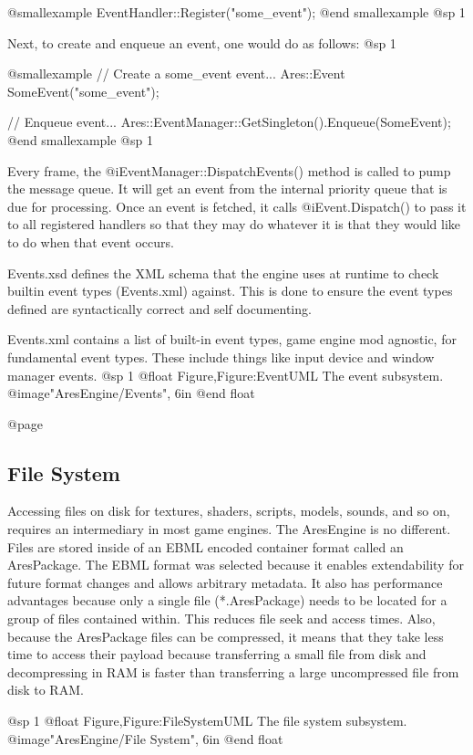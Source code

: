 @smallexample
EventHandler::Register("some_event");
@end smallexample
@sp 1

Next, to create and enqueue an event, one would do as follows:
@sp 1

@smallexample
// Create a some_event event...
Ares::Event SomeEvent("some_event");

// Enqueue event...
Ares::EventManager::GetSingleton().Enqueue(SomeEvent);
@end smallexample
@sp 1

Every frame, the @i{EventManager::DispatchEvents()} method is called to pump the message queue. It will get an event from the internal priority queue that is due for processing. Once an event is fetched, it calls @i{Event.Dispatch()} to pass it to all registered handlers so that they may do whatever it is that they would like to do when that event occurs.

Events.xsd defines the XML schema that the engine uses at runtime to check builtin event types (Events.xml) against. This is done to ensure the event types defined are syntactically correct and self documenting.

Events.xml contains a list of built-in event types, game engine mod agnostic, for fundamental event types. These include things like input device and window manager events.
@sp 1
@float Figure,Figure:EventUML
The event subsystem.
@image{"AresEngine/Events", 6in}
@end float

@page 
\subsection{File System}
Accessing files on disk for textures, shaders, scripts, models, sounds, and so on, requires an intermediary in most game engines. The AresEngine is no different. Files are stored inside of an EBML encoded container format called an AresPackage. The EBML format was selected because it enables extendability for future format changes and allows arbitrary metadata. It also has performance advantages because only a single file (*.AresPackage) needs to be located for a group of files contained within. This reduces file seek and access times. Also, because the AresPackage files can be compressed, it means that they take less time to access their payload because transferring a small file from disk and decompressing in RAM is faster than transferring a large uncompressed file from disk to RAM.
            
@sp 1
@float Figure,Figure:FileSystemUML
The file system subsystem.
@image{"AresEngine/File System", 6in}
@end float

